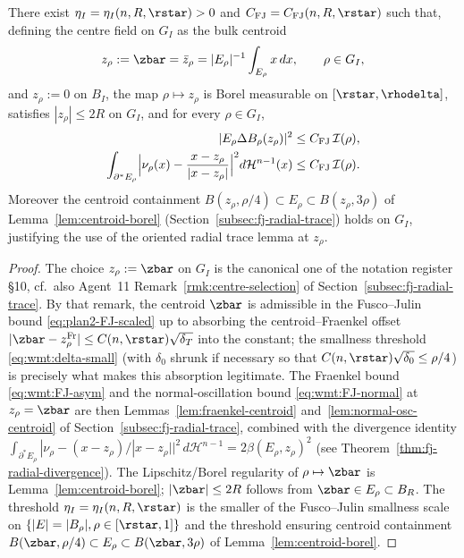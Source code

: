 \begin{lemma}
\label{lem:fj-center-package}\label{lem:FJ-package}
There exist $\eta_I=\eta_I(n,R,\rstar)>0$ and
$C_{\mathrm{FJ}}=C_{\mathrm{FJ}}(n,R,\rstar)$ such that, defining the
centre field on $G_I$ as the bulk centroid
\begin{equation}\label{eq:wmt:zrho-is-centroid}
   z_\rho:=\zbar=\bar z_\rho=|E_\rho|^{-1}\int_{E_\rho}x\,dx,
   \qquad \rho\in G_I,
\end{equation}
and $z_\rho:=0$ on $B_I$, the map $\rho\mapsto z_\rho$ is Borel
measurable on $[\rstar,\rhodelta]$, satisfies $|z_\rho|\le 2R$ on
$G_I$, and for every $\rho\in G_I$,
\begin{align}
   |E_\rho\Delta B_\rho(z_\rho)|^2
      &\le C_{\mathrm{FJ}}\,\mathcal I(\rho),\label{eq:wmt:FJ-asym}\\
   \int_{\partial^*E_\rho}
      \Bigl|\nu_\rho(x)-\frac{x-z_\rho}{|x-z_\rho|}\Bigr|^2
      d\mathcal H^{n-1}(x)
      &\le C_{\mathrm{FJ}}\,\mathcal I(\rho).\label{eq:wmt:FJ-normal}
\end{align}
Moreover the centroid containment
\(B(z_\rho,\rho/4)\subset E_\rho\subset B(z_\rho,3\rho)\) of
Lemma~\ref{lem:centroid-borel} (Section~\ref{subsec:fj-radial-trace})
holds on $G_I$, justifying the use of the oriented radial trace lemma
at $z_\rho$.
\end{lemma}

\begin{proof}
The choice $z_\rho:=\zbar$ on $G_I$ is the canonical one of the
notation register \S10, cf.\ also Agent~11
Remark~\ref{rmk:centre-selection} of
Section~\ref{subsec:fj-radial-trace}. By that remark, the centroid
$\zbar$ is admissible in the Fusco--Julin bound \eqref{eq:plan2-FJ-scaled}
up to absorbing the centroid--Fraenkel offset
$|\zbar-z^{\mathrm{Fr}}_\rho|\le C(n,\rstar)\sqrt{\delta_T}$ into the
constant; the smallness threshold \eqref{eq:wmt:delta-small} (with
$\delta_0$ shrunk if necessary so that
$C(n,\rstar)\sqrt{\delta_0}\le\rho/4$) is precisely what makes this
absorption legitimate. The Fraenkel bound
\eqref{eq:wmt:FJ-asym} and the normal-oscillation bound
\eqref{eq:wmt:FJ-normal} at $z_\rho=\zbar$ are then
Lemmas~\ref{lem:fraenkel-centroid} and~\ref{lem:normal-osc-centroid}
of Section~\ref{subsec:fj-radial-trace}, combined with the divergence
identity \(\int_{\partial^*E_\rho}|\nu_\rho-(x-z_\rho)/|x-z_\rho||^2\,
d\mathcal H^{n-1}=2\beta(E_\rho,z_\rho)^2\) (see
Theorem~\ref{thm:fj-radial-divergence}). The Lipschitz/Borel
regularity of $\rho\mapsto\zbar$ is Lemma~\ref{lem:centroid-borel};
$|\zbar|\le 2R$ follows from $\zbar\in E_\rho\subset B_R$. The
threshold $\eta_I=\eta_I(n,R,\rstar)$ is the smaller of the
Fusco--Julin smallness scale on $\{|E|=|B_\rho|,\rho\in[\rstar,1]\}$
and the threshold ensuring centroid containment
\(B(\zbar,\rho/4)\subset E_\rho\subset B(\zbar,3\rho)\) of
Lemma~\ref{lem:centroid-borel}.
\end{proof}

